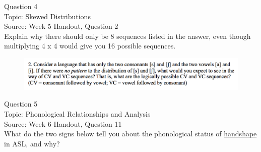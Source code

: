 \documentclass[12pt]{article}
\begin{document}
{\large Question 4}\\

Topic: Skewed Distributions\\
Source: Week 5 Handout, Question 2\\

Explain why there should only be 8 sequences listed in the answer, even though multiplying 4 x 4 would give you 16 possible sequences.\\

\begin{figure}[H]
\includegraphics{../images/skew2.png}
\end{figure}

\newpage

{\large Question 5}\\

Topic: Phonological Relationships and Analysis\\
Source: Week 6 Handout, Question 11\\

What do the two signs below tell you about the phonological status of \underline{handshape} in ASL, and why?\\
\end{document}
